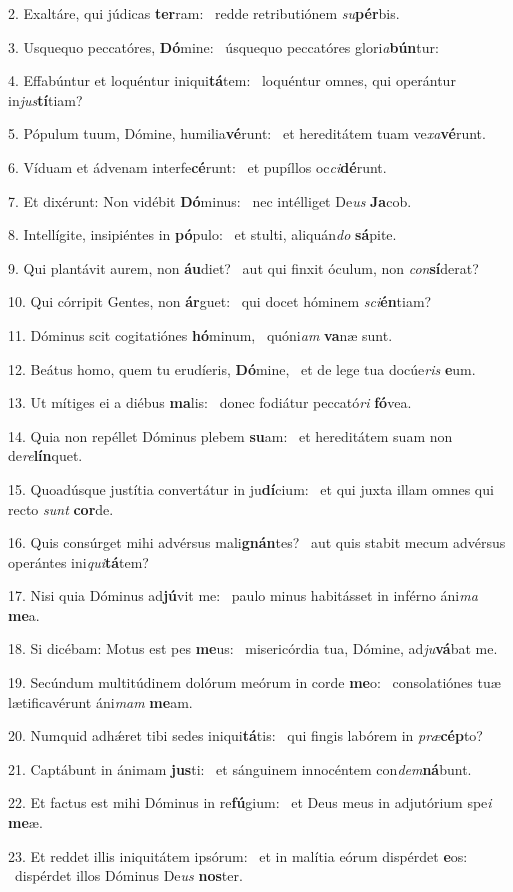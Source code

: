 2. Exaltáre, qui júdicas \textbf{ter}ram: \ast\  redde retributiónem \textit{su}\textbf{pér}bis.\

3. Usquequo peccatóres, \textbf{Dó}mine: \ast\  úsquequo peccatóres glori\textit{a}\textbf{bún}tur:\

4. Effabúntur et loquéntur iniqui\textbf{tá}tem: \ast\  loquéntur omnes, qui operántur in\textit{jus}\textbf{tí}tiam?\

5. Pópulum tuum, Dómine, humilia\textbf{vé}runt: \ast\  et hereditátem tuam ve\textit{xa}\textbf{vé}runt.\

6. Víduam et ádvenam interfe\textbf{cé}runt: \ast\  et pupíllos oc\textit{ci}\textbf{dé}runt.\

7. Et dixérunt: Non vidébit \textbf{Dó}minus: \ast\  nec intélliget De\textit{us} \textbf{Ja}cob.\

8. Intellígite, insipiéntes in \textbf{pó}pulo: \ast\  et stulti, aliquán\textit{do} \textbf{sá}pite.\

9. Qui plantávit aurem, non \textbf{áu}diet? \ast\  aut qui finxit óculum, non \textit{con}\textbf{sí}derat?\

10. Qui córripit Gentes, non \textbf{ár}guet: \ast\  qui docet hóminem \textit{sci}\textbf{én}tiam?\

11. Dóminus scit cogitatiónes \textbf{hó}minum, \ast\  quóni\textit{am} \textbf{va}næ sunt.\

12. Beátus homo, quem tu erudíeris, \textbf{Dó}mine, \ast\  et de lege tua docúe\textit{ris} \textbf{e}um.\

13. Ut mítiges ei a diébus \textbf{ma}lis: \ast\  donec fodiátur peccató\textit{ri} \textbf{fó}vea.\

14. Quia non repéllet Dóminus plebem \textbf{su}am: \ast\  et hereditátem suam non de\textit{re}\textbf{lín}quet.\

15. Quoadúsque justítia convertátur in ju\textbf{dí}cium: \ast\  et qui juxta illam omnes qui recto \textit{sunt} \textbf{cor}de.\

16. Quis consúrget mihi advérsus mali\textbf{gnán}tes? \ast\  aut quis stabit mecum advérsus operántes ini\textit{qui}\textbf{tá}tem?\

17. Nisi quia Dóminus ad\textbf{jú}vit me: \ast\  paulo minus habitásset in inférno áni\textit{ma} \textbf{me}a.\

18. Si dicébam: Motus est pes \textbf{me}us: \ast\  misericórdia tua, Dómine, ad\textit{ju}\textbf{vá}bat me.\

19. Secúndum multitúdinem dolórum meórum in corde \textbf{me}o: \ast\  consolatiónes tuæ lætificavérunt áni\textit{mam} \textbf{me}am.\

20. Numquid adhǽret tibi sedes iniqui\textbf{tá}tis: \ast\  qui fingis labórem in \textit{præ}\textbf{cép}to?\

21. Captábunt in ánimam \textbf{jus}ti: \ast\  et sánguinem innocéntem con\textit{dem}\textbf{ná}bunt.\

22. Et factus est mihi Dóminus in re\textbf{fú}gium: \ast\  et Deus meus in adjutórium spe\textit{i} \textbf{me}æ.\

23. Et reddet illis iniquitátem ipsórum: \dag\  et in malítia eórum dispérdet \textbf{e}os: \ast\  dispérdet illos Dóminus De\textit{us} \textbf{nos}ter.\

